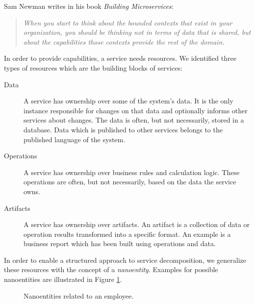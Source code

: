 Sam Newman writes in his book \textit{Building Microservices}\cite[p. 34]{newman2015building}: 

\begin{quote}
	\textit{When you start to think about the bounded contexts that exist in your organization, you should be thinking not in terms of data that is shared, but about the capabilities those contexts provide the rest of the domain.}
\end{quote}

In order to provide capabilities, a service needs resources. We identified three types of resources which are the building blocks of services:

\begin{description}
	\item[Data] A service has ownership over some of the system's data. It is the only instance responsible for changes on that data and optionally informs other services about changes. The data is often, but not necessarily, stored in a database. Data which is published to other services belongs to the published language of the system.
	\item[Operations] A service has ownership over business rules and calculation logic. These operations are often, but not necessarily, based on the data the service owns.
	\item[Artifacts] A service has ownership over artifacts. An artifact is a collection of data or operation results transformed into a specific format. An example is a business report which has been built using operations and data.
\end{description}

In order to enable a structured approach to service decomposition, we generalize these resources with the concept of a \textit{nanoentity}. Examples for possible nanoentities are illustrated in Figure \ref{fig:nanoentities}.

\begin{figure}[H]
	\caption{Nanoentities related to an employee.}
	\label{fig:nanoentities}
\end{figure}	

